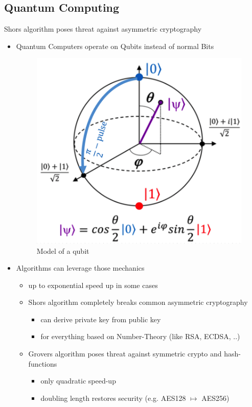 \documentclass[ucs,10pt]{beamer}
\begin{document}
\subsection{Quantum Computing}
\begin{frame}{Shors algorithm poses threat against asymmetric cryptography}
  \begin{itemize}
  \item
    Quantum Computers operate on Qubits instead of normal Bits
  \begin{figure}[htbp]
    \centering
    \includegraphics[width=.2\textwidth]{../graphics/The-Bloch-sphere-provides-a-useful-means-of-visualizing-the-state-of-a-single-qubit-and.png}
    \caption{Model of a qubit \cite{img:bloch}}
    \label{qubit}
  \end{figure}
  \item
    Algorithms can leverage those mechanics
    \begin{itemize}
      \item up to exponential speed up in some cases
      \item Shors algorithm completely breaks common asymmetric cryptography
      \begin{itemize}
        \item can derive private key from public key
        \item for everything based on Number-Theory (like RSA, ECDSA, ..)
      \end{itemize}
      \item  Grovers algorithm poses threat against symmetric crypto and hash-functions
      \begin{itemize}
        \item only quadratic speed-up
        \item doubling length restores security (e.g. AES128 $\mapsto$ AES256)
      \end{itemize}
    \end{itemize}
  \end{itemize}
\end{frame}
\end{document}
